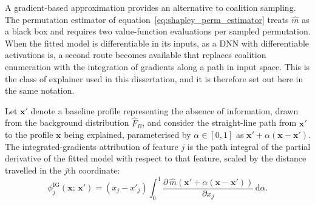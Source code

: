   \noindent
  A gradient-based approximation provides an alternative to coalition
  sampling. The permutation estimator of
  equation~\eqref{eq:shapley_perm_estimator} treats \(\widehat{m}\) as a
  black box and requires two value-function evaluations per sampled
  permutation. When the fitted model is differentiable in its inputs, as a
  DNN with differentiable activations is, a second route becomes
  available that replaces coalition enumeration with the integration of
  gradients along a path in input space. This is the class of explainer
  used in this dissertation, and it is therefore set out here in the same
  notation.

  \noindent
  Let \(\mathbf{x}'\) denote a baseline profile representing the absence of
  information, drawn from the background distribution
  \(\widehat{F}_{B}\), and consider the straight-line path from
  \(\mathbf{x}'\) to the profile \(\mathbf{x}\) being explained,
  parameterised by \(\alpha\in[0,1]\) as
  \(\mathbf{x}'+\alpha(\mathbf{x}-\mathbf{x}')\). The integrated-gradients
  attribution of feature \(j\) is the path integral of the partial
  derivative of the fitted model with respect to that feature, scaled by
  the distance travelled in the \(j\)th coordinate:
  \begin{equation}
  \label{eq:integrated_gradients}
      \phi^{\mathrm{IG}}_{j}
      \!\left(
          \mathbf{x};\,\mathbf{x}'
      \right)
      =
      \left(
          x_{j}-x'_{j}
      \right)
      \int_{0}^{1}
      \frac{\partial\,\widehat{m}
      \!\left(
          \mathbf{x}'+\alpha(\mathbf{x}-\mathbf{x}')
      \right)}
      {\partial x_{j}}
      \,\mathrm{d}\alpha .
  \end{equation}

